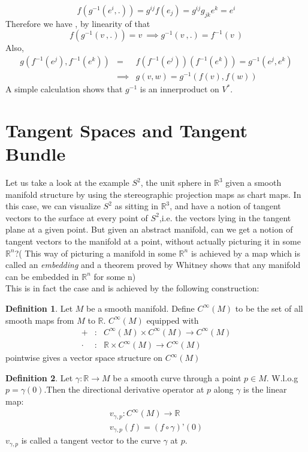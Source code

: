 \documentclass[a4paper]{report}
\theoremstyle{definition}
\newtheorem{definition}{Definition}[section]
\theoremstyle{remark}
\begin{document}
		\begin{equation*}
			f(g^{-1}(e^i,.))=g^{ij}f(e_j) = g^{ij}g_{jk}e^k=e^i
		\end{equation*}
		Therefore we have , by linearity of that 
		\begin{equation*}
			f(g^{-1}(v~,.))=v~ \implies g^{-1}(v~,.)= f^{-1}(v~)
		\end{equation*}
		Also, 
		\begin{eqnarray*}
			g(f^{-1}(e^j), f^{-1}(e^k))&=&f(f^{-1}(e^j))( f^{-1}(e^k))=g^{-1}(e^j,e^k) \\
			&\implies & g(v,w)=g^{-1}(f(v),f(w)) 
		\end{eqnarray*}
		A simple calculation shows that  $g^{-1}$ is an innerproduct on $V^*$. 

	\section{Tangent Spaces and Tangent Bundle}
		Let us take a look at the example $S^2$, the unit sphere in $\mathbb{R}^3$ given a smooth manifold structure by using the stereographic projection maps as chart maps. In this case, we can visualize $S^2$ as sitting in $\mathbb{R}^3$, and have a notion of tangent vectors to the surface at every point of $S^2$,i.e. the vectors lying in the tangent plane at a given point. But given an abstract manifold, can we get a notion of tangent vectors to the manifold at a point, without actually picturing it in some $\mathbb{R}^n$?( This way of picturing a manifold in some $\mathbb{R}^n$ is achieved by a map which is called an \emph{embedding} and a theorem proved by Whitney shows that any manifold can be embedded in $\mathbb{R}^n$ for some n) \\
		This is in fact the case and is achieved by the following construction:
		\begin{definition}
			Let $M$ be a smooth manifold. Define $C^{\infty}(M)$ to be the set of all smooth maps from $M$ to $\mathbb{R}$. $C^{\infty}(M)$ equipped with 
			\begin{eqnarray*}
				+ &:& C^{\infty}(M) \times C^{\infty}(M) \to C^{\infty}(M) \\ \cdot &:& \mathbb{R} \times C^{\infty}(M) \to C^{\infty}(M)
			\end{eqnarray*}
			pointwise gives a vector space structure on $C^{\infty}(M)$
		\end{definition}
		\begin{definition} 
			Let $\gamma : \mathbb{R} \to M$ be a smooth curve through a point $p \in M$. W.l.o.g $p=\gamma(0)$.Then the directional derivative operator at $p$ along $\gamma$ is the linear map:
			\begin{eqnarray*} 
				v_{\gamma,p} : C^{\infty}(M) \to \mathbb{R} \\ v_{\gamma,p}(f) = (f \circ \gamma)’(0) 
			\end{eqnarray*}
			$v_{\gamma,p}$ is called a tangent vector to the curve $\gamma$ at $p$.
		\end{definition}
\end{document}
